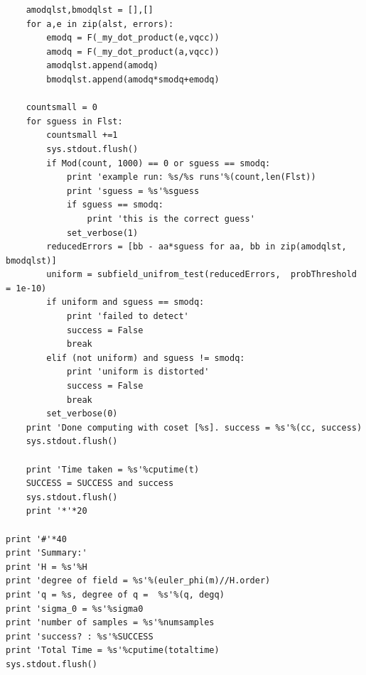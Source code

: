 \documentclass[envcountsame]{llncs}
\begin{document}
\begin{verbatim}
    amodqlst,bmodqlst = [],[]
    for a,e in zip(alst, errors):
        emodq = F(_my_dot_product(e,vqcc))
        amodq = F(_my_dot_product(a,vqcc))
        amodqlst.append(amodq)
        bmodqlst.append(amodq*smodq+emodq)

    countsmall = 0
    for sguess in Flst:
        countsmall +=1
        sys.stdout.flush()
        if Mod(count, 1000) == 0 or sguess == smodq:
            print 'example run: %s/%s runs'%(count,len(Flst))
            print 'sguess = %s'%sguess
            if sguess == smodq:
                print 'this is the correct guess'
            set_verbose(1)
        reducedErrors = [bb - aa*sguess for aa, bb in zip(amodqlst, bmodqlst)]
        uniform = subfield_unifrom_test(reducedErrors,  probThreshold = 1e-10)
        if uniform and sguess == smodq:
            print 'failed to detect'
            success = False
            break
        elif (not uniform) and sguess != smodq:
            print 'uniform is distorted'
            success = False
            break
        set_verbose(0)
    print 'Done computing with coset [%s]. success = %s'%(cc, success)
    sys.stdout.flush()

    print 'Time taken = %s'%cputime(t)
    SUCCESS = SUCCESS and success
    sys.stdout.flush()
    print '*'*20

print '#'*40
print 'Summary:'
print 'H = %s'%H
print 'degree of field = %s'%(euler_phi(m)//H.order)
print 'q = %s, degree of q =  %s'%(q, degq)
print 'sigma_0 = %s'%sigma0
print 'number of samples = %s'%numsamples
print 'success? : %s'%SUCCESS
print 'Total Time = %s'%cputime(totaltime)
sys.stdout.flush()
\end{verbatim}
\end{document}
